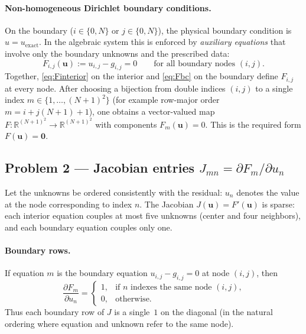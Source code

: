 \documentclass[11pt]{article}
\begin{document}
\paragraph{Non-homogeneous Dirichlet boundary conditions.}
On the boundary ($i\in\{0,N\}$ or $j\in\{0,N\}$), the physical boundary condition is $u=u_{\mathrm{exact}}$. In the algebraic system this is enforced by \emph{auxiliary equations} that involve only the boundary unknowns and the prescribed data:
\begin{equation}
\label{eq:Fbc}
  F_{i,j}(\mathbf{u}) := u_{i,j} - g_{i,j} = 0
  \qquad\text{for all boundary nodes } (i,j).
\end{equation}
Together, \eqref{eq:Finterior} on the interior and \eqref{eq:Fbc} on the boundary define $F_{i,j}$ at every node. After choosing a bijection from double indices $(i,j)$ to a single index $m\in\{1,\ldots,(N+1)^2\}$ (for example row-major order $m = i + j(N{+}1) + 1$), one obtains a vector-valued map $F:\mathbb{R}^{(N+1)^2}\to\mathbb{R}^{(N+1)^2}$ with components $F_m(\mathbf{u})=0$. This is the required form $F(\mathbf{u})=\mathbf{0}$.

\subsection*{Problem 2 --- Jacobian entries $J_{mn}=\partial F_m/\partial u_n$}

Let the unknowns be ordered consistently with the residual: $u_n$ denotes the value at the node corresponding to index $n$. The Jacobian $J(\mathbf{u})=F'(\mathbf{u})$ is sparse: each interior equation couples at most five unknowns (center and four neighbors), and each boundary equation couples only one.

\paragraph{Boundary rows.}
If equation $m$ is the boundary equation $u_{i,j}-g_{i,j}=0$ at node $(i,j)$, then
\[
  \frac{\partial F_m}{\partial u_n} =
  \begin{cases}
    1, & \text{if $n$ indexes the same node $(i,j)$,}\\
    0, & \text{otherwise.}
  \end{cases}
\]
Thus each boundary row of $J$ is a single~$1$ on the diagonal (in the natural ordering where equation and unknown refer to the same node).
\end{document}
